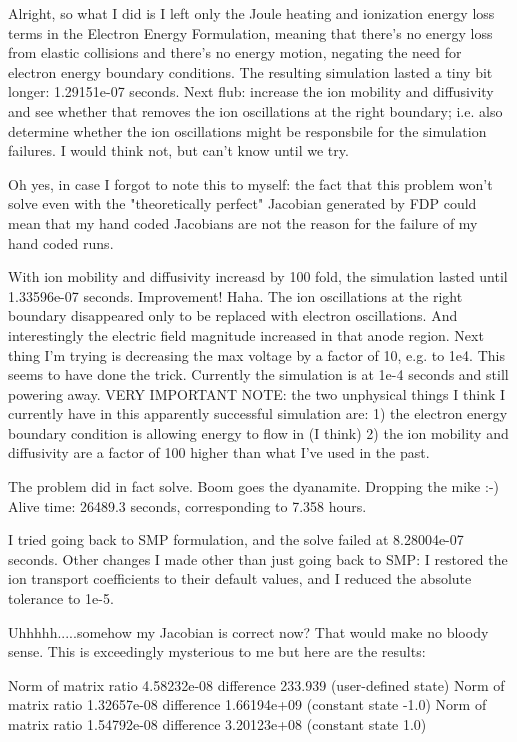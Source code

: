 Alright, so what I did is I left only the Joule heating and ionization energy loss terms in the Electron Energy Formulation, meaning that there's no energy loss from elastic collisions and there's no energy motion, negating the need for electron energy boundary conditions. The resulting simulation lasted a tiny bit longer: 1.29151e-07 seconds. Next flub: increase the ion mobility and diffusivity and see whether that removes the ion oscillations at the right boundary; i.e. also determine whether the ion oscillations might be responsbile for the simulation failures. I would think not, but can't know until we try.

Oh yes, in case I forgot to note this to myself: the fact that this problem won't solve even with the "theoretically perfect" Jacobian generated by FDP could mean that my hand coded Jacobians are not the reason for the failure of my hand coded runs.

With ion mobility and diffusivity increasd by 100 fold, the simulation lasted until 1.33596e-07 seconds. Improvement! Haha. The ion oscillations at the right boundary disappeared only to be replaced with electron oscillations. And interestingly the electric field magnitude increased in that anode region. Next thing I'm trying is decreasing the max voltage by a factor of 10, e.g. to 1e4. This seems to have done the trick. Currently the simulation is at 1e-4 seconds and still powering away. VERY IMPORTANT NOTE: the two unphysical things I think I currently have in this apparently successful simulation are: 1) the electron energy boundary condition is allowing energy to flow in (I think) 2) the ion mobility and diffusivity are a factor of 100 higher than what I've used in the past.

The problem did in fact solve. Boom goes the dyanamite. Dropping the mike :-)  Alive time: 26489.3 seconds, corresponding to 7.358 hours.

I tried going back to SMP formulation, and the solve failed at 8.28004e-07 seconds. Other changes I made other than just going back to SMP: I restored the ion transport coefficients to their default values, and I reduced the absolute tolerance to 1e-5.

Uhhhhh.....somehow my Jacobian is correct now? That would make no bloody sense. This is exceedingly mysterious to me but here are the results:

Norm of matrix ratio 4.58232e-08 difference 233.939 (user-defined state)
Norm of matrix ratio 1.32657e-08 difference 1.66194e+09 (constant state -1.0)
Norm of matrix ratio 1.54792e-08 difference 3.20123e+08 (constant state 1.0)

